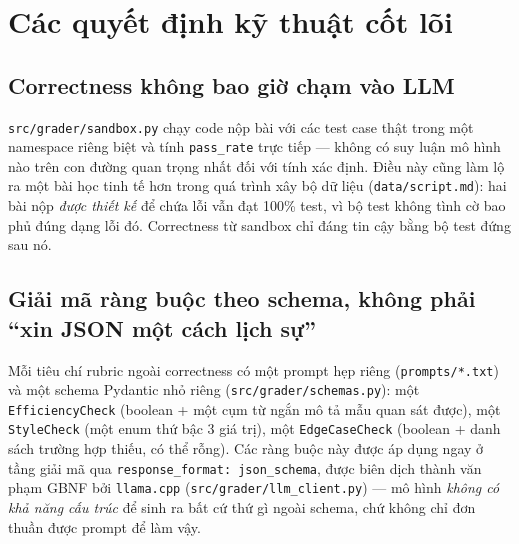 \documentclass[11pt,a4paper]{article}
\begin{document}
\section{Các quyết định kỹ thuật cốt lõi}

\subsection{Correctness không bao giờ chạm vào LLM}

\texttt{src/grader/sandbox.py} chạy code nộp bài với các test case thật
trong một namespace riêng biệt và tính \texttt{pass\_rate} trực tiếp —
không có suy luận mô hình nào trên con đường quan trọng nhất đối với tính
xác định. Điều này cũng làm lộ ra một bài học tinh tế hơn trong quá trình
xây bộ dữ liệu (\texttt{data/script.md}): hai bài nộp \emph{được thiết kế}
để chứa lỗi vẫn đạt 100\% test, vì bộ test không tình cờ bao phủ đúng dạng
lỗi đó. Correctness từ sandbox chỉ đáng tin cậy bằng bộ test đứng sau nó.

\subsection{Giải mã ràng buộc theo schema, không phải ``xin JSON một cách lịch sự''}

Mỗi tiêu chí rubric ngoài correctness có một prompt hẹp riêng
(\texttt{prompts/*.txt}) và một schema Pydantic nhỏ riêng
(\texttt{src/grader/schemas.py}): một \texttt{EfficiencyCheck} (boolean +
một cụm từ ngắn mô tả mẫu quan sát được), một \texttt{StyleCheck} (một
enum thứ bậc 3 giá trị), một \texttt{EdgeCaseCheck} (boolean + danh sách
trường hợp thiếu, có thể rỗng). Các ràng buộc này được áp dụng ngay ở tầng
giải mã qua \texttt{response\_format: json\_schema}, được biên dịch thành
văn phạm GBNF bởi \texttt{llama.cpp}
(\texttt{src/grader/llm\_client.py}) — mô hình \emph{không có khả năng cấu
trúc} để sinh ra bất cứ thứ gì ngoài schema, chứ không chỉ đơn thuần được
prompt để làm vậy.
\end{document}

